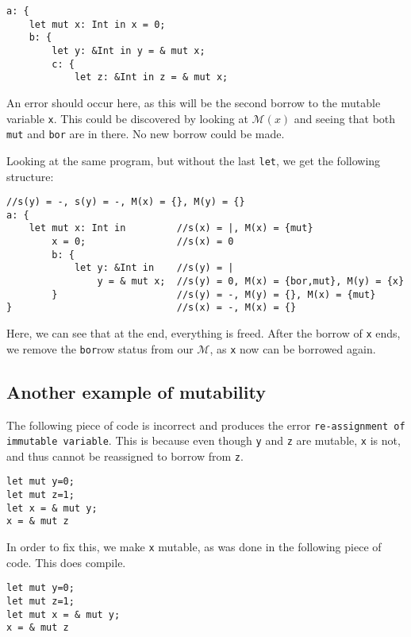 \begin{verbatim}
a: {
    let mut x: Int in x = 0;
    b: {
        let y: &Int in y = & mut x;
        c: {
            let z: &Int in z = & mut x;
\end{verbatim}

An error should occur here, as this will be the second borrow to the mutable variable \texttt{x}. This could be discovered by looking at $\mathcal{M}(x)$ and seeing that both \texttt{mut} and \texttt{bor} are in there. No new borrow could be made. 

Looking at the same program, but without the last \texttt{let}, we get the following structure:

\begin{verbatim}
//s(y) = -, s(y) = -, M(x) = {}, M(y) = {}
a: {                          
    let mut x: Int in         //s(x) = |, M(x) = {mut}
        x = 0;                //s(x) = 0
        b: {
            let y: &Int in    //s(y) = |
                y = & mut x;  //s(y) = 0, M(x) = {bor,mut}, M(y) = {x}
        }                     //s(y) = -, M(y) = {}, M(x) = {mut}
}                             //s(x) = -, M(x) = {}
\end{verbatim}

Here, we can see that at the end, everything is freed. After the borrow of \texttt{x} ends, we remove the \texttt{bor}row status from our $\mathcal{M}$, as \texttt{x} now can be borrowed again. 

\subsection{Another example of mutability}
The following piece of code is incorrect and produces the error \texttt{re-assignment of immutable variable}. This is because even though \texttt{y} and \texttt{z} are mutable, \texttt{x} is not, and thus cannot be reassigned to borrow from \texttt{z}. 
\begin{verbatim}
let mut y=0;
let mut z=1;
let x = & mut y; 
x = & mut z
\end{verbatim}

In order to fix this, we make \texttt{x} mutable, as was done in the following piece of code. This does compile.

\begin{verbatim}
let mut y=0;
let mut z=1;
let mut x = & mut y; 
x = & mut z
\end{verbatim}



